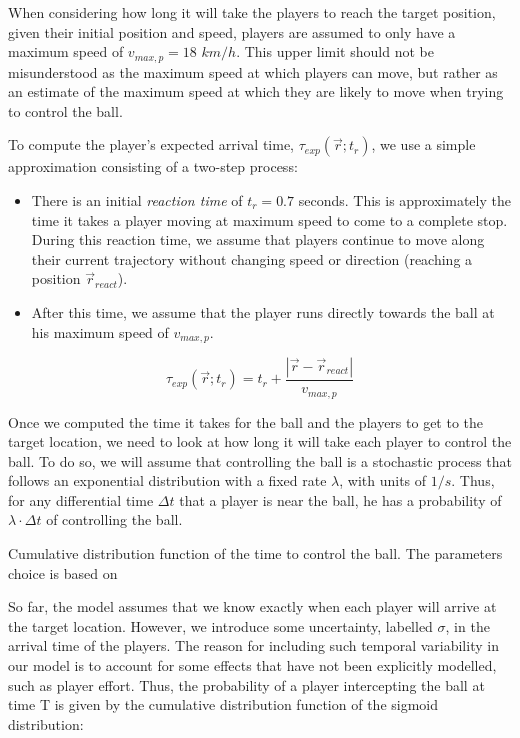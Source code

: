 \documentclass[twoside,nohyper]{tufte-book}
\begin{document}
When considering how long it will take the players to reach the target
position, given their initial position and speed, players are assumed to
only have a maximum speed of \(v_{max,p} = 18\) \(km/h\). This upper limit
should not be misunderstood as the maximum speed at which players can
move, but rather as an estimate of the maximum speed at which they are
likely to move when trying to control the ball.

To compute the player's expected arrival time,
\(\tau_{exp}(\vec{r} ; t_r)\), we use a simple approximation consisting of
a two-step process:

\begin{itemize}
\item
  There is an initial \emph{reaction time} of \(t_{r} = 0.7\) seconds. This
  is approximately the time it takes a player moving at maximum speed
  to come to a complete stop. During this reaction time, we assume
  that players continue to move along their current trajectory without
  changing speed or direction (reaching a position \(\vec{r}_{react}\)).
\item
  After this time, we assume that the player runs directly towards the
  ball at his maximum speed of \(v_{max,p}\).
\end{itemize}

\[\tau_{exp}(\vec{r} ; t_r) = t_r + \frac{|\vec{r} - \vec{r}_{react}|}{v_{max,p}}
    \label{exp_arr_time}\]

Once we computed the time it takes for the ball and the players to get
to the target location, we need to look at how long it will take each
player to control the ball. To do so, we will assume that controlling
the ball is a stochastic process that follows an exponential
distribution with a fixed rate \(\lambda\), with units of \(1/s\). Thus, for
any differential time \(\Delta t\) that a player is near the ball, he has
a probability of \(\lambda \cdot \Delta t\) of controlling the ball.

Cumulative distribution function of the time to control the
ball. The parameters choice is based on {}

So far, the model assumes that we know exactly when each player will
arrive at the target location. However, we introduce some uncertainty,
labelled \(\sigma\), in the arrival time of the players. The reason for
including such temporal variability in our model is to account for some
effects that have not been explicitly modelled, such as player effort.
Thus, the probability of a player intercepting the ball at time T is
given by the cumulative distribution function of the sigmoid
distribution:
\end{document}
